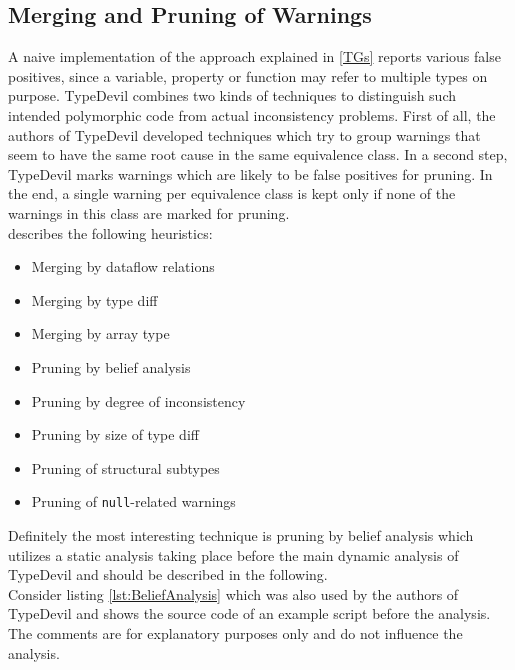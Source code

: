 \documentclass[runningheads,a4paper]{llncs}
\begin{document}
\newpage
\subsection{Merging and Pruning of Warnings}

A naive implementation of the approach explained in \ref{TGs} reports various false positives, since a variable, property or function may refer to multiple types on purpose. 
TypeDevil combines two kinds of techniques to distinguish such intended polymorphic code from actual inconsistency problems. 
First of all, the authors of TypeDevil developed techniques which try to group warnings that seem to have the same root cause in the same equivalence class.
In a second step, TypeDevil marks warnings which are likely to be false positives for pruning.
In the end, a single warning per equivalence class is kept only if none of the warnings in this class are marked for pruning.\\
\cite{DBLP:conf/icse/PradelSS15} describes the following heuristics:
\begin{itemize}
    \item Merging by dataflow relations
    \item Merging by type diff
    \item Merging by array type
    \item Pruning by belief analysis
    \item Pruning by degree of inconsistency
    \item Pruning by size of type diff
    \item Pruning of structural subtypes
    \item Pruning of \lstinline[columns=fixed]{null}-related warnings
  \end{itemize}
Definitely the most interesting technique is pruning by belief analysis which utilizes a static analysis taking place before the main dynamic analysis of TypeDevil and should be described in the following.\\
Consider listing \ref{lst:BeliefAnalysis} which was also used by the authors of TypeDevil \cite{DBLP:conf/icse/PradelSS15} and shows the source code of an example script before the analysis. The comments are for explanatory purposes only and do not influence the analysis.
\end{document}
